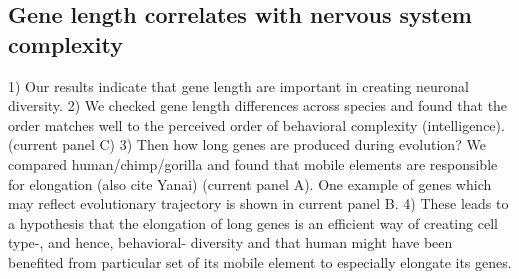 \subsection{Gene length correlates with nervous system complexity}

1) Our results indicate that gene length are important in creating neuronal diversity.
2) We checked gene length differences across species and found that the order matches well to the perceived order of behavioral complexity (intelligence).  (current panel C)
3) Then how long genes are produced during evolution? We compared human/chimp/gorilla and found that mobile elements are responsible for elongation (also cite Yanai) (current panel A). One example of genes which may reflect evolutionary trajectory is shown in current panel B. 
4) These leads to a hypothesis that the elongation of long genes is an efficient way of creating cell type-, and hence, behavioral- diversity and that human might have been benefited from particular set of its mobile element to especially elongate its genes. 

